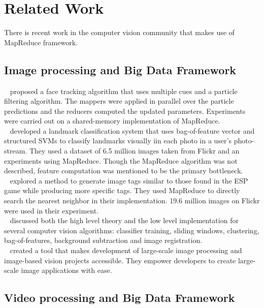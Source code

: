 \section{Related Work}
\label{sec:sec_background}



There is recent work in the computer vision community that makes use of
MapReduce framework. 

\subsection{Image processing and Big Data Framework}
\citeauthor{2009_ICME_Liu}~\cite{2009_ICME_Liu} proposed a face tracking
algorithm that uses multiple cues and a particle filtering algorithm. The mappers were applied in parallel
over the particle predictions and the reducers computed the updated parameters.
Experiments were carried out on a shared-memory implementation of MapReduce. \\
\citeauthor{2009_ICCV_Li}~\cite{2009_ICCV_Li} developed a landmark
classification system that uses bag-of-feature vector and structured SVMs to classify landmarks visually iin
each photo in a user's photo-stream. They used a dataset of 6.5 million images
taken from Flickr and an experiments using MapReduce. Though the MapReduce
algorithm was not described, feature computation was mentioned to be the primary
bottleneck. \\
\citeauthor{2009_WSMC_Kennedy}~\cite{2009_WSMC_Kennedy} explored a method to
generate image tags similar to those found in the ESP game while producing more specific tags. They used
MapReduce to directly search the nearest neighbor in their implementation. 19.6
million images on Flickr were used in their experiment. \\
\citeauthor{2010_KDD_White}~\cite{2010_KDD_White} discussed both the high level
theory and the low level implementation for several computer vision algorithms:
classifier training, sliding windows, clustering, bag-of-features, background
subtraction and image registration. \\
\citeauthor{2011_thesis_sweeney}~\cite{2011_thesis_sweeney} created a tool that
makes development of large-scale image processing and image-based vision projects
accessible. They empower developers to create large-scale image applications
with ease.

\subsection{Video processing and Big Data Framework}




 
 